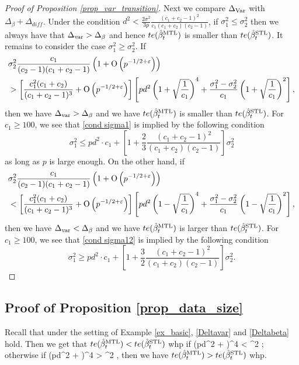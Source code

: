 \begin{proof}[Proof of Proposition \ref{prop_var_transition}]
Next we compare $\Delta_{\operatorname{Var}}$ with $\Delta_\beta + \Delta_{diff}$. Under the condition $d^2 < \frac {2\sigma^2} {3p} \frac{(c_1 + c_2 -1)^2}{c_1 (c_1 + c_2)(c_2 - 1)}$, if $\sigma_1^2\le \sigma_2^2$ then we always have that $\Delta_{\text{var}} > \Delta_{\beta}$ and hence $te(\hat{\beta}_t^{\text{MTL}})$ is smaller than $te(\hat{\beta}_t^{\text{STL}})$. It remains to consider the case $\sigma_1^2 \ge \sigma_2^2$. If 
\begin{align} 
&\sigma_2^2  \frac{c_1}{(c_2-1)(c_1 + c_2 -1)}\left(1 + \operatorname{O}\left(p^{-1/2 + \varepsilon}\right)\right) \label{cond sigma1}\\
&> \left[\frac{c_1^2 (c_1+c_2)}{(c_1+c_2-1)^3} + \operatorname{O}\left(p^{-1/2 + \varepsilon}\right)\right]\left[pd^2 \left({1 + \sqrt{\frac{1}{c_1}}}\right)^4 + \frac{\sigma_1^2-\sigma_2^2}{c_1} \left({1 + \sqrt{\frac{1}{c_1}}}\right)^2\right] ,\nonumber
\end{align}
then we have $\Delta_{\text{var}} > \Delta_{\beta}$ and we have $te(\hat{\beta}_t^{\text{MTL}})$ is smaller than $te(\hat{\beta}_t^{\text{STL}})$. For $c_1\ge 100$, we see that \eqref{cond sigma1} is implied by the following condition
$$\sigma_1^2 \le pd^2 \cdot c_1 + \left[ 1+ \frac23\frac{(c_1 + c_2 - 1)^2}{(c_1 + c_2) (c_2 - 1)} \right]\sigma_2^2$$
as long as $p$ is large enough. On the other hand, if 
\begin{align} 
&\sigma_2^2  \frac{c_1}{(c_2-1)(c_1 + c_2 -1)}\left(1 + \operatorname{O}\left(p^{-1/2 + \varepsilon}\right)\right) \label{cond sigma12}\\
&< \left[\frac{c_1^2 (c_1+c_2)}{(c_1+c_2-1)^3} + \operatorname{O}\left(p^{-1/2 + \varepsilon}\right)\right]\left[pd^2 \left({1 - \sqrt{\frac{1}{c_1}}}\right)^4 + \frac{\sigma_1^2-\sigma_2^2}{c_1} \left({1 - \sqrt{\frac{1}{c_1}}}\right)^2\right] ,\nonumber
\end{align}
then we have $\Delta_{\text{var}} < \Delta_{\beta}$ and we have $te(\hat{\beta}_t^{\text{MTL}})$ is larger than $te(\hat{\beta}_t^{\text{STL}})$. For $c_1\ge 100$, we see that \eqref{cond sigma12} is implied by the following condition
$$\sigma_1^2 \ge  pd^2 \cdot c_1 + \left[ 1+ \frac32\frac{(c_1 + c_2 - 1)^2}{(c_1 + c_2) (c_2 - 1)} \right]\sigma_2^2.$$
\end{proof}

\subsection{Proof of Proposition \ref{prop_data_size}}


Recall that under the setting of Example \ref{ex_basic}, \eqref{Deltavar} and \eqref{Deltabeta} hold.  Then we get that $te(\hat{\beta}_t^{\text{MTL}})< te(\hat{\beta}_t^{\text{STL}})$ whp if
\be\label{pos1}\left(pd^2  +  \right)^4 <  \sigma^2 ;\ee
otherwise if
\be\label{neg1}\left(pd^2  +  \right)^4 >  \sigma^2 ,\ee
then we have $te(\hat{\beta}_t^{\text{MTL}})> te(\hat{\beta}_t^{\text{STL}})$ whp.

